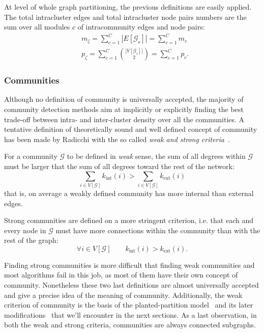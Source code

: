 \noindent At level of whole graph partitioning, the previous definitions are easily applied. The total intracluster edges and total intracluster node pairs numbers are the sum over all modules $c$ of intracommunity edges and node pairs:
\begin{align}
&m_\zeta= \sum \limits_{c=1}^C |E[\mathcal{G_c}]| = \sum \limits_{c=1}^C m_c \\
&p_\zeta= \sum \limits_{c=1}^C \binom{|V[\mathcal{G_c}]|}{2} = \sum \limits_{c=1}^C p_c.
\end{align}

\subsubsection{Communities}
Although no definition of community is universally accepted, the majority of community detection methods aim at implicitly or explicitly finding the best trade-off between intra- and inter-cluster density over all the communities.
A tentative definition of theoretically sound and well defined concept of community has been made by Radicchi with the so called \emph{weak and strong criteria}~\cite{radicchi2004}.

For a community $\mathcal{G}$ to be defined in \emph{weak} sense, the sum of all degrees within $\mathcal{G}$ must be larger that the sum of all degrees toward the rest of the network:
\begin{equation}\label{eq:communityweak}
\sum \limits_{i \in V[\mathcal{G}]} k_{\textrm{int}}(i) > \sum \limits_{i \in V[\mathcal{G}]} k_{\textrm{ext}}(i)
\end{equation}
that is, on average a weakly defined community has more internal than external edges.

Strong communities are defined on a more stringent criterion, i.e. that each and every node in $\mathcal{G}$ must have more connections within the community than with the rest of the graph:
\begin{equation}
\forall i \in V[\mathcal{G}] \qquad k_{\textrm{int}}(i) > k_{\textrm{ext}}(i).
\end{equation}

Finding strong communities is more difficult that finding weak communities and most algorithms fail in this job, as most of them have their own concept of community. Nonetheless these two last definitions are almost universally accepted and give a precise idea of the meaning of community. Additionally, the weak criterion of community is the basis of the planted-partition model~\cite{condon2000} and its later modifications~\cite{lancichinetti2008} that we'll encounter in the next sections. As a last observation, in both the weak and strong criteria, communities are always connected subgraphs.

